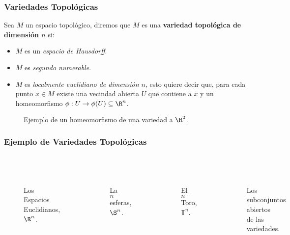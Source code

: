 \begin{frame}
\frametitle{Variedades Topológicas}
\begin{definition}
  Sea $M$ un espacio topológico, diremos que $M$ es una \textbf{variedad topológica de dimensión $n$} si:
  \begin{itemize}
    \item $M$ es un \textit{espacio de Hausdorff}.
    \item $M$ es \textit{segundo numerable}.
    \item $M$ es \textit{localmente euclidiano de dimensión $n$}, esto quiere decir que, para cada punto $x \in M$ existe una vecindad abierta $U$ que contiene a $x$ y un homeomorfismo $\phi: U \to \phi(U)\subseteq \R^n$.
  \end{itemize}
\end{definition}
\end{frame}

\begin{frame}
\centering
\begin{figure}
  
  \caption{Ejemplo de un homeomorfismo de una variedad a $\R^{2}$.}
\end{figure}
\end{frame}

\begin{frame}
\frametitle{Ejemplo de Variedades Topológicas}
\begin{columns}[t]
\centering
  \begin{figure}
    \scalebox{.5}{}\\
    \caption{Los Espacios Euclidianos, $\R^n$.}
  \end{figure}
  \begin{figure}
    \scalebox{.5}{}\\
  \caption{La $n-$esferas, $\S^n$.}
  \end{figure}
\centering
  \begin{figure}
    \scalebox{.5}{}\\
    \caption{El $n-$Toro, $\mathbb{T}^n$.}
  \end{figure}
  \begin{figure}
    \centering
    \scalebox{.5}{}\\
    \caption{Los subconjuntos abiertos\\ de las variedades.}
  \end{figure}
\end{columns}
\end{frame}

